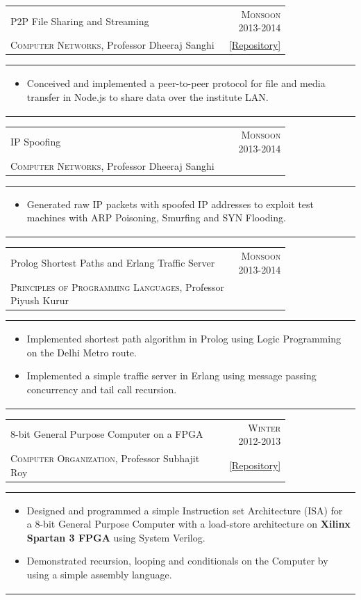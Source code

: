 \documentclass[a4paper,10pt]{article} %
\newcommand{\cproject}[5]{
    \begin{tabular}{p{0.80\linewidth}r}
        \textcolor{NavyBlue}{#2} & \multicolumn{1}{m{4cm}}{\raggedleft \textsc{#1}}\\
        #3 & #4
    \end{tabular}
    \begin{tabular}{p{\linewidth}}
    \vspace{-0.3cm}
        \footnotesize{#5}
    \end{tabular}
    \vspace{-0.5cm}
}
\begin{document}
\cproject
    {Monsoon 2013-2014}
    {P2P File Sharing and Streaming}
    {\textsc{Computer Networks}, Professor Dheeraj Sanghi}
    { \href{https://github.com/srijanshetty/nodesock}{ \footnotesize{[Repository]} } }
    {
     \begin{itemize}[leftmargin=0.5cm]
         \item Conceived and implemented a peer-to-peer protocol for file and media transfer in Node.js to share
             data over the institute LAN.
     \end{itemize}
    }

\cproject
    {Monsoon 2013-2014}
    {IP Spoofing}
    {\textsc{Computer Networks}, Professor Dheeraj Sanghi}
    {}
    {
      \begin{itemize}[leftmargin=0.5cm]
          \item Generated raw IP packets with spoofed IP addresses to exploit test machines with ARP Poisoning,
              Smurfing and SYN Flooding.
      \end{itemize}
    }

\cproject
    {Monsoon 2013-2014}
    {Prolog Shortest Paths and Erlang Traffic Server}
    {\textsc{Principles of Programming Languages}, Professor Piyush Kurur}
    {}
    {
       \begin{itemize}[leftmargin=0.5cm]
           \item Implemented shortest path algorithm in Prolog using Logic Programming on the Delhi Metro route.
           \item Implemented a simple traffic server in Erlang using message passing concurrency and tail call recursion.
       \end{itemize}
    }

\cproject
    {Winter 2012-2013}
    {8-bit General Purpose Computer on a FPGA}
    {\textsc{Computer Organization}, Professor Subhajit Roy}
    { \href{https://github.com/srijanshetty/220\_y11} {\footnotesize{[Repository]}} }
    {
      \begin{itemize}[leftmargin=0.5cm]
          \item Designed and programmed a simple Instruction set Architecture (ISA) for a 8-bit General Purpose Computer with a load-store
              architecture on \textbf{Xilinx Spartan 3 FPGA} using System Verilog.
          \item Demonstrated recursion, looping and conditionals on the Computer by using a simple assembly language.
      \end{itemize}
    }
\end{document}
